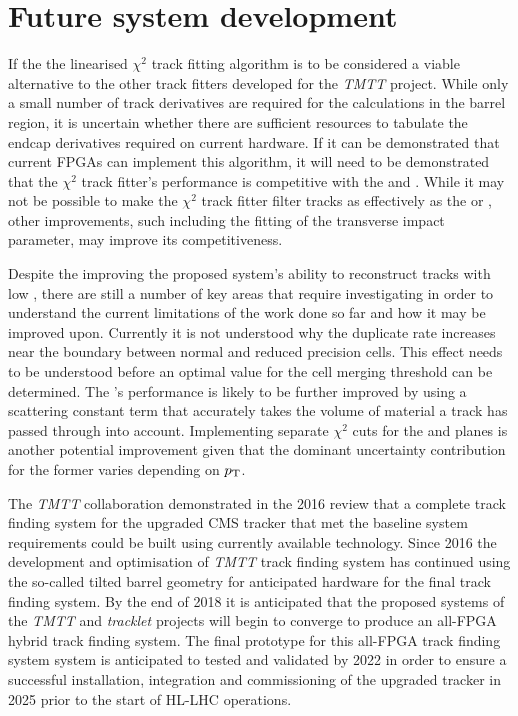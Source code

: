 \section{Future system development}
If the the linearised $\chi^{2}$ track fitting algorithm is to be considered a viable alternative to the other track fitters developed for the \emph{TMTT} project.
While only a small number of track derivatives are required for the calculations in the barrel region, it is uncertain whether there are sufficient resources to tabulate the endcap derivatives required on current hardware.
If it can be demonstrated that current FPGAs can implement this algorithm, it will need to be demonstrated that the $\chi^{2}$ track fitter's performance is competitive with the \KF and \LR.
While it may not be possible to make the $\chi^{2}$ track fitter filter tracks as effectively as the \KF or \LR , other improvements, such including the fitting of the transverse impact parameter, may improve its competitiveness.

Despite the improving the proposed system's ability to reconstruct tracks with low \pT, there are still a number of key areas that require investigating in order to understand the current limitations of the work done so far and how it may be improved upon.
Currently it is not understood why the duplicate rate increases near the boundary between normal and reduced precision \HT cells.
This effect needs to be understood before an optimal value for the cell merging threshold can be determined.
The \KF's performance is likely to be further improved by using a scattering constant term that accurately takes the volume of material a track has passed through into account.
Implementing separate \KF $\chi^{2}$ cuts for the \rphi and \rz planes is another potential improvement given that the dominant uncertainty contribution for the former varies depending on $p_{\mathrm{T}}$.


The \emph{TMTT} collaboration demonstrated in the 2016 review that a complete track finding system for the upgraded CMS tracker that met the baseline system requirements could be built using currently available technology.
Since 2016 the development and optimisation of \emph{TMTT} track finding system has continued using the so-called tilted barrel geometry for anticipated hardware for the final track finding system.
By the end of 2018 it is anticipated that the proposed systems of the \emph{TMTT} and \emph{tracklet} projects will begin to converge to produce an all-FPGA hybrid track finding system.
The final prototype for this all-FPGA track finding system system is anticipated to tested and validated by 2022 in order to ensure a successful installation, integration and commissioning of the upgraded tracker in 2025 prior to the start of HL-LHC operations.

